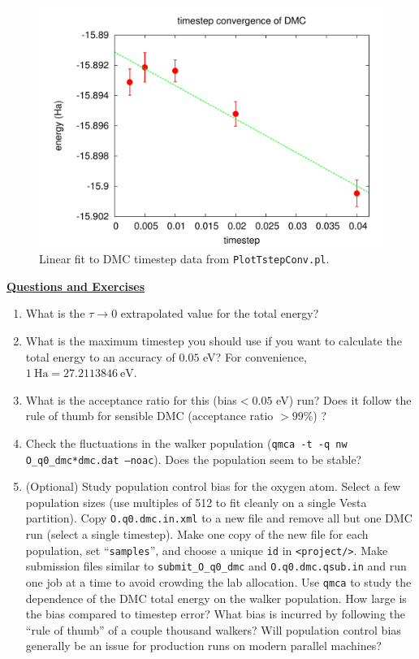 \begin{figure}
\begin{center}
\includegraphics[trim = 0mm 0mm 0mm 0mm, clip,width=0.75\columnwidth]{./figures/lab_qmc_basics_timestep_conv}
\end{center}
\caption{Linear fit to DMC timestep data from \texttt{PlotTstepConv.pl}.
\label{fig:timestep_conv}
}
\end{figure}


\vspace{1cm}
\begin{flushleft}
\textbf{\underline{Questions and Exercises}}
\end{flushleft}
\begin{enumerate}
  \item{What is the $\tau\rightarrow 0$ extrapolated value for the total energy?}
  \item{What is the maximum timestep you should use if you want to calculate the total energy to an accuracy of $0.05$ eV?  For convenience, $1~\textrm{Ha}=27.2113846~\textrm{eV}$.}
  \item{What is the acceptance ratio for this (bias$<0.05$ eV) run?  Does it follow the rule of thumb for sensible DMC (acceptance ratio $>99$\%) ?}
  \item{Check the fluctuations in the walker population (\texttt{qmca -t -q nw O\_q0\_dmc*dmc.dat --noac}).  Does the population seem to be stable?}
  \item{(Optional) Study population control bias for the oxygen atom.  Select a few population sizes (use multiples of 512 to fit cleanly on a single Vesta partition).  Copy \texttt{O.q0.dmc.in.xml} to a new file and remove all but one DMC run (select a single timestep).  Make one copy of the new file for each population, set ``\texttt{samples}'', and choose a unique \texttt{id} in \texttt{<project/>}.  Make submission files similar to \texttt{submit\_O\_q0\_dmc} and \texttt{O.q0.dmc.qsub.in} and run one job at a time to avoid crowding the lab allocation.  Use \texttt{qmca} to study the dependence of the DMC total energy on the walker population.  How large is the bias compared to timestep error?  What bias is incurred by following the ``rule of thumb'' of a couple thousand walkers?  Will population control bias generally be an issue for production runs on modern parallel machines?}
\end{enumerate}


